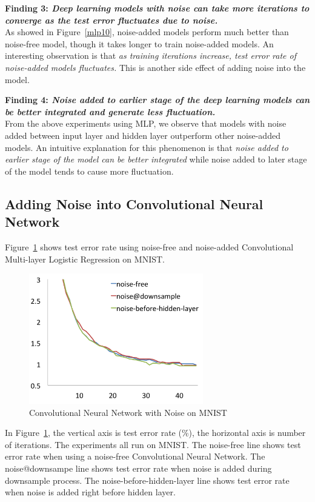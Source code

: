 {\bf Finding 3: {\em Deep learning models with noise can take more iterations to
converge as the test error fluctuates due to noise.}} \\
As showed in Figure~\ref{mlp10}, noise-added models perform much better than
noise-free model, though it takes longer to train noise-added models.
An interesting observation is that {\em as training iterations increase,
test error rate of noise-added models fluctuates.} This is another side
effect of adding noise into the model.

{\bf Finding 4: {\em Noise added to earlier stage of the deep learning models
can be better integrated and generate less fluctuation.}} \\
From the above experiments using MLP, we observe that models with noise added
between input layer and hidden layer outperform other noise-added models.
An intuitive explanation for this phenomenon is that {\em noise added to
earlier stage of the model can be better integrated} while noise added to
later stage of the model tends to cause more fluctuation.

\subsection{Adding Noise into Convolutional Neural Network}
Figure~\ref{convo} shows test error rate using noise-free and noise-added
Convolutional Multi-layer Logistic Regression on MNIST.
\begin{figure}[!htbp]
\centering
\includegraphics[width=215pt]{f-figs/convo.png}
\caption{Convolutional Neural Network with Noise on MNIST}
\label{convo}
\end{figure}
In Figure~\ref{convo}, the vertical axis is test error rate (\%), the
horizontal axis is number of iterations. The experiments all run on MNIST.
The noise-free line shows test error rate when using a noise-free
Convolutional Neural Network. The noise@downsampe line shows test error
rate when noise is added during downsample process. The noise-before-hidden-layer line shows test error rate when noise is added right before hidden layer.

